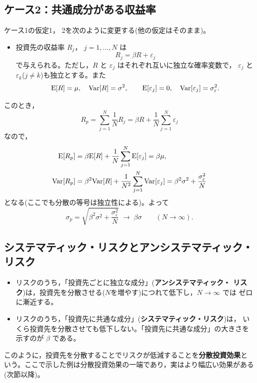 \subsection{ケース2：共通成分がある収益率}

ケース1の仮定1， 2を次のように変更する(他の仮定はそのまま)。

\begin{itemize}
\item[1'.] 投資先の収益率 $R_j$， $j=1,\dots,N$ は
\begin{equation}
R_j = \beta R + \varepsilon_j
\end{equation}
で与えられる。ただし，$R$ と $\varepsilon_j$ はそれぞれ互いに独立な確率変数で，
$\varepsilon_j$ と $\varepsilon_k$($j\neq k$)も独立とする。また
\[
\mathrm{E}[R] = \mu,\quad \mathrm{Var}[R] = \sigma^2,\qquad
\mathrm{E}[\varepsilon_j] = 0,\quad \mathrm{Var}[\varepsilon_j] = \sigma_\varepsilon^2.
\]
\end{itemize}

このとき，
\[
R_p = \sum_{j=1}^{N}\frac{1}{N}R_j
= \beta R + \frac{1}{N}\sum_{j=1}^{N}\varepsilon_j
\]
なので，
\begin{align}
\mathrm{E}[R_p] &= \beta\mathrm{E}[R] + \frac{1}{N}\sum_{j=1}^{N}\mathrm{E}[\varepsilon_j] = \beta\mu,\\
\mathrm{Var}[R_p] &= \beta^2\mathrm{Var}[R] + \frac{1}{N^2}\sum_{j=1}^{N}\mathrm{Var}[\varepsilon_j]
= \beta^2\sigma^2 + \frac{\sigma_\varepsilon^2}{N}
\end{align}
となる(ここでも分散の等号は独立性による)。よって
\begin{equation}
\sigma_p = \sqrt{\beta^2\sigma^2 + \frac{\sigma_\varepsilon^2}{N}}
\;\longrightarrow\; \beta\sigma \qquad (N\to\infty).
\end{equation}

\subsection{システマティック・リスクとアンシステマティック・リスク}

\begin{keypoint}[分散投資効果]
\begin{itemize}
\item リスクのうち，「投資先ごとに独立な成分」(\textbf{アンシステマティック・
リスク})は，投資先を分散させる($N$を増やす)につれて低下し，$N\to\infty$ では
ゼロに漸近する。
\item リスクのうち，「投資先に共通な成分」(\textbf{システマティック・リスク})は，
いくら投資先を分散させても低下しない。「投資先に共通な成分」の大きさを示すのが
$\beta$ である。
\end{itemize}
このように，投資先を分散することでリスクが低減することを\textbf{分散投資効果}と
いう。ここで示した例は分散投資効果の一端であり，実はより幅広い効果がある
(次節以降)。
\end{keypoint}

